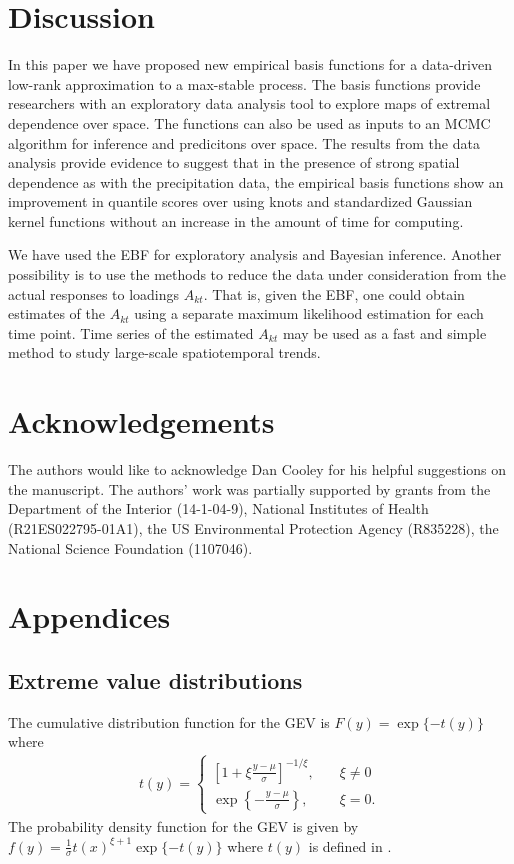 \documentclass[11pt]{article}
\begin{document}
\section{Discussion}\label{ebs:con}
In this paper we have proposed new empirical basis functions for a data-driven low-rank approximation to a max-stable process.
The basis functions provide researchers with an exploratory data analysis tool to explore maps of extremal dependence over space.
The functions can also be used as inputs to an MCMC algorithm for inference and predicitons over space.
The results from the data analysis provide evidence to suggest that in the presence of strong spatial dependence as with the precipitation data, the empirical basis functions show an improvement in quantile scores over using knots and standardized Gaussian kernel functions without an increase in the amount of time for computing.

We have used the EBF for exploratory analysis and Bayesian inference.
Another possibility is to use the methods to reduce the data under consideration from the actual responses to loadings $A_{kt}$.
That is, given the EBF, one could obtain estimates of the $A_{kt}$ using a separate maximum likelihood estimation for each time point.
Time series of the estimated $A_{kt}$ may be used as a fast and simple method to study large-scale spatiotemporal trends.

\section*{Acknowledgements}
The authors would like to acknowledge Dan Cooley for his helpful suggestions on the manuscript.
The authors' work was partially supported by grants from the Department of the Interior (14-1-04-9), National Institutes of Health (R21ES022795-01A1), the US Environmental Protection Agency (R835228), the National Science Foundation (1107046).

\appendix
\section{Appendices}
\subsection{Extreme value distributions} \label{eba:GEV}
The cumulative distribution function for the GEV is $F(y) = \exp\{-t(y)\}$ where
\begin{align} \label{ebeq:gevt}
  t(y) = \left\{ \begin{array}{ll}
      \left[1 + \xi \displaystyle \frac{y - \mu}{\sigma}\right]^{-1 / \xi}, \quad &\xi \neq 0 \\ [0.5em]
      \exp\left\{- \displaystyle \frac{y - \mu}{\sigma}\right\}, &\xi = 0.
  \end{array}\right.
\end{align}
The probability density function for the GEV is given by $f(y) = \frac{1}{\sigma} t(x)^{\xi + 1} \exp\{-t(y)\}$ where $t(y)$ is defined in .
\end{document}
